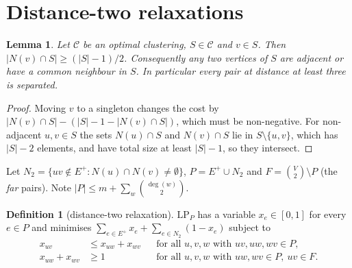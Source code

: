 \documentclass[11pt]{article}
\newtheorem{lemma}[theorem]{Lemma}
\theoremstyle{definition}
\newtheorem{definition}[theorem]{Definition}
\newcommand{\Ep}{E^{+}}
\newcommand{\Nt}{N_{2}}
\begin{document}
\section{Distance-two relaxations}\label{sec:relax}

\begin{lemma}\label{lem:half}
Let $\mathcal C$ be an optimal clustering, $S\in\mathcal C$ and $v\in S$.  Then
$|N(v)\cap S|\ge (|S|-1)/2$.  Consequently any two vertices of $S$ are
adjacent or have a common neighbour in $S$.  In particular every pair at
distance at least three is separated.
\end{lemma}
\begin{proof}
Moving $v$ to a singleton changes the cost by $|N(v)\cap S|-(|S|-1-|N(v)\cap
S|)$, which must be non-negative.  For non-adjacent $u,v\in S$ the sets
$N(u)\cap S$ and $N(v)\cap S$ lie in $S\setminus\{u,v\}$, which has $|S|-2$
elements, and have total size at least $|S|-1$, so they intersect.
\end{proof}

Let $\Nt=\{uv\notin\Ep: N(u)\cap N(v)\ne\emptyset\}$, $P=\Ep\cup\Nt$ and
$F=\binom V2\setminus P$ (the \emph{far} pairs).  Note
$|P|\le m+\sum_{w}\binom{\deg(w)}{2}$.

\begin{definition}[distance-two relaxation]
$\mathrm{LP}_P$ has a variable $x_e\in[0,1]$ for every $e\in P$ and minimises
$\sum_{e\in\Ep}x_e+\sum_{e\in\Nt}(1-x_e)$ subject to
\begin{align}
x_{uv}&\le x_{uw}+x_{wv} &&\text{for all } u,v,w \text{ with } uv,uw,wv\in P,\label{eq:t1}\\
x_{uw}+x_{wv}&\ge 1 &&\text{for all } u,v,w \text{ with } uw,wv\in P,\ uv\in F.\label{eq:t2}
\end{align}
\end{definition}
\end{document}
